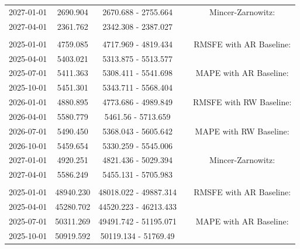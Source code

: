 \begin{table}
\begin{tabular}[t]{ccccc}
\hspace{1em}2027-01-01 & 2690.904 & 2670.688 - 2755.664 &  & Mincer-Zarnowitz:\\
\hspace{1em}2027-04-01 & 2361.762 & 2342.308 - 2387.027 &  & \\
\addlinespace[0.3em]
\multicolumn{5}{l}{\textbf{EmiCO2RoaTra}}\\
\hspace{1em}2025-01-01 & 4759.085 & 4717.969 - 4819.434 &  & RMSFE with AR Baseline:\\
\hspace{1em}2025-04-01 & 5403.021 & 5313.875 - 5513.577 &  & \\
\hspace{1em}2025-07-01 & 5411.363 & 5308.411 - 5541.698 &  & MAPE with AR Baseline:\\
\hspace{1em}2025-10-01 & 5451.301 & 5343.711 - 5568.404 &  & \\
\hspace{1em}2026-01-01 & 4880.895 & 4773.686 - 4989.849 &  & RMSFE with RW Baseline:\\
\hspace{1em}2026-04-01 & 5580.779 & 5461.56 - 5713.659 &  & \\
\hspace{1em}2026-07-01 & 5490.450 & 5368.043 - 5605.642 &  & MAPE with RW Baseline:\\
\hspace{1em}2026-10-01 & 5459.654 & 5330.259 - 5545.006 &  & \\
\hspace{1em}2027-01-01 & 4920.251 & 4821.436 - 5029.394 &  & Mincer-Zarnowitz:\\
\hspace{1em}2027-04-01 & 5586.249 & 5455.131 - 5705.983 &  & \\
\addlinespace[0.3em]
\multicolumn{5}{l}{\textbf{RealConsHH}}\\
\hspace{1em}2025-01-01 & 48940.230 & 48018.022 - 49887.314 &  & RMSFE with AR Baseline:\\
\hspace{1em}2025-04-01 & 45280.702 & 44520.223 - 46213.433 &  & \\
\hspace{1em}2025-07-01 & 50311.269 & 49491.742 - 51195.071 &  & MAPE with AR Baseline:\\
\hspace{1em}2025-10-01 & 50919.592 & 50119.134 - 51769.49 &  & \\

\end{tabular}
\end{table}
